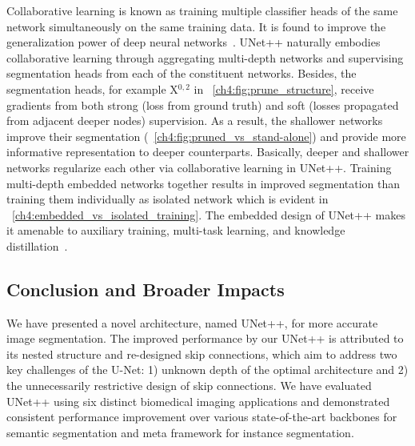 Collaborative learning is known as training multiple classifier heads of the same network simultaneously on the same training data. It is found to improve the generalization power of deep neural networks~\citep{song2018collaborative}. UNet++ naturally embodies collaborative learning through aggregating multi-depth networks and supervising segmentation heads from each of the constituent networks. Besides, the segmentation heads, for example X$^{0,2}$ in \figurename~\ref{ch4:fig:prune_structure}, receive gradients from both strong (loss from ground truth) and soft (losses propagated from adjacent deeper nodes) supervision. As a result, the shallower networks improve their segmentation (\figurename~\ref{ch4:fig:pruned_vs_stand-alone}) and provide more informative representation to deeper counterparts. Basically, deeper and shallower networks regularize each other via collaborative learning in UNet++. Training multi-depth embedded networks together results in improved segmentation than training them individually as isolated network which is evident in \sectionname~\ref{ch4:embedded_vs_isolated_training}. The embedded design of UNet++ makes it amenable to auxiliary training, multi-task learning, and knowledge distillation~\citep{bengio2009learning,hinton2015distilling,song2018collaborative}.



\subsection{Conclusion and Broader Impacts}
\label{ch4:discussion_conclusion:conclusion_broader_impacts}

We have presented a novel architecture, named UNet++, for more accurate image segmentation. The improved performance by our UNet++ is attributed to its nested structure and re-designed skip connections, which aim to address two key challenges of the U-Net: 1) unknown depth of the optimal architecture and 2) the unnecessarily restrictive design of skip connections. We have evaluated UNet++ using six distinct biomedical imaging applications and demonstrated consistent performance improvement over various state-of-the-art backbones for semantic segmentation and meta framework for instance segmentation.

